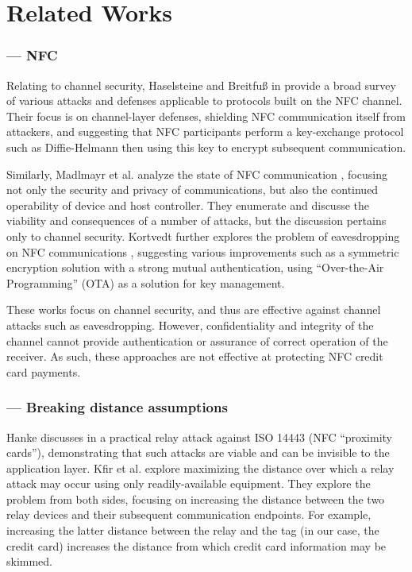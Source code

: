 \section{Related Works}
\label{sec:related}


\subsubsection*{--- NFC}

Relating to channel security, Haselsteine and Breitfu{\ss} in \cite{haselsteiner2006security} provide a broad survey
    of various attacks and defenses applicable to protocols built on the NFC channel.
Their focus is on channel-layer defenses, shielding NFC communication itself from attackers,
    and suggesting that NFC participants perform a key-exchange protocol such as Diffie-Helmann \cite{diffiehellman}
    then using this key to encrypt subsequent communication.

Similarly, Madlmayr et al. analyze the state of NFC communication \cite{madlmayr2008nfc},
    focusing not only the security and privacy of communications, but also the continued operability of device and host controller.
They enumerate and discusse the viability and consequences of a number of attacks, but the discussion pertains only to channel security.
Kortvedt further explores the problem of eavesdropping on NFC communications \cite{kortvedt2009securing},
    suggesting various improvements such as a symmetric encryption solution with a strong mutual authentication,
    using ``Over-the-Air Programming'' (OTA) as a solution for key management.

These works \cite{haselsteiner2006security, kortvedt2009securing, madlmayr2008nfc} focus on channel security,
    and thus are effective against channel attacks such as eavesdropping.
However, confidentiality and integrity of the channel cannot provide authentication or assurance of correct operation of the receiver.
As such, these approaches are not effective at protecting NFC credit card payments.

\subsubsection*{--- Breaking distance assumptions}

Hanke discusses in \cite{hancke2005practical} a practical relay attack against ISO 14443 (NFC ``proximity cards''),
    demonstrating that such attacks are viable and can be invisible to the application layer.
Kfir et al. \cite{kfir2005picking} explore maximizing the distance over which a relay attack may occur using only readily-available equipment.
    They explore the problem from both sides, focusing on increasing the distance between the two relay devices and their subsequent communication endpoints.
For example, increasing the latter distance between the relay and the tag (in our case, the credit card)
    increases the distance from which credit card information may be skimmed.


